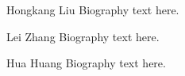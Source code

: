 \documentclass[journal]{IEEEtran}
\begin{document}
%
%
%


% 

\begin{IEEEbiography}{Hongkang Liu}
Biography text here.
\end{IEEEbiography}

\begin{IEEEbiographynophoto}{Lei Zhang}
Biography text here.
\end{IEEEbiographynophoto}


\begin{IEEEbiographynophoto}{Hua Huang}
Biography text here.
\end{IEEEbiographynophoto}






\end{document}
